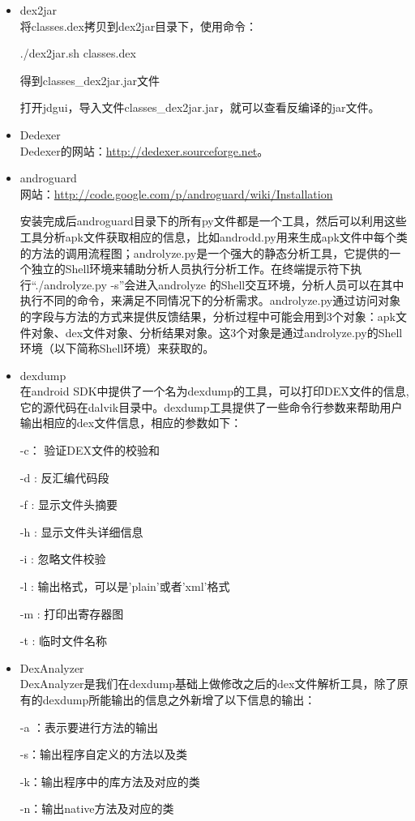 \begin{itemize}
\item dex2jar\\
将classes.dex拷贝到dex2jar目录下，使用命令：

./dex2jar.sh classes.dex

得到classes\_dex2jar.jar文件

打开jdgui，导入文件classes\_dex2jar.jar，就可以查看反编译的jar文件。

\item Dedexer\\
Dedexer的网站：\url{http://dedexer.sourceforge.net}。

\item androguard\\
网站：\url{http://code.google.com/p/androguard/wiki/Installation}

安装完成后androguard目录下的所有py文件都是一个工具，然后可以利用这些工具分析apk文件获取相应的信息，比如androdd.py用来生成apk文件中每个类的方法的调用流程图；androlyze.py是一个强大的静态分析工具，它提供的一个独立的Shell环境来辅助分析人员执行分析工作。在终端提示符下执行“./androlyze.py -s”会进入androlyze 的Shell交互环境，分析人员可以在其中执行不同的命令，来满足不同情况下的分析需求。androlyze.py通过访问对象的字段与方法的方式来提供反馈结果，分析过程中可能会用到3个对象：apk文件对象、dex文件对象、分析结果对象。这3个对象是通过androlyze.py的Shell环境（以下简称Shell环境）来获取的。

\item dexdump\\
在android SDK中提供了一个名为dexdump的工具，可以打印DEX文件的信息,它的源代码在dalvik目录中。dexdump工具提供了一些命令行参数来帮助用户输出相应的dex文件信息，相应的参数如下：

-c： 验证DEX文件的校验和

-d :  反汇编代码段

-f : 显示文件头摘要

-h : 显示文件头详细信息

-i : 忽略文件校验

-l : 输出格式，可以是'plain'或者'xml'格式

-m :  打印出寄存器图

-t : 临时文件名称

\item DexAnalyzer\\
DexAnalyzer是我们在dexdump基础上做修改之后的dex文件解析工具，除了原有的dexdump所能输出的信息之外新增了以下信息的输出：

-a ：表示要进行方法的输出

-s：输出程序自定义的方法以及类

-k：输出程序中的库方法及对应的类

-n：输出native方法及对应的类

\end{itemize}

